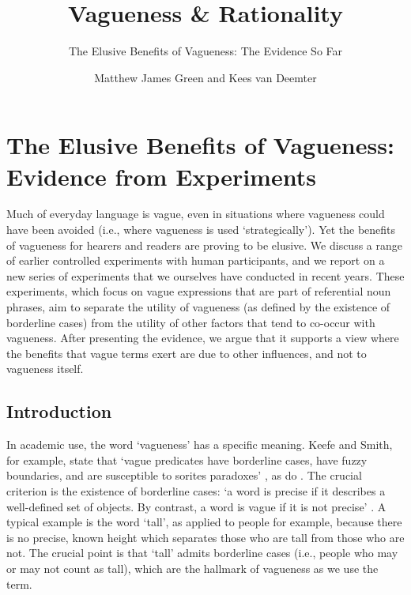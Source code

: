 \documentclass[ %
  graybox       %
 ,envcountchap  %
 ,sectrefs      %
]{svmono}
\begin{document}
\author{Matthew James Green and Kees van Deemter}
\title{Vagueness \& Rationality}
\subtitle{The Elusive Benefits of Vagueness: The Evidence So Far}
\date{}
\maketitle
\frontmatter
\tableofcontents
\mainmatter

\chapter{The Elusive Benefits of Vagueness: Evidence from Experiments}
Much of everyday language is vague, even in situations where vagueness could have been avoided (i.e., where vagueness is used `strategically').
Yet the benefits of vagueness for hearers and readers are proving to be elusive.
We discuss a range of earlier controlled experiments with human participants, and we report on a new series of experiments that we ourselves have conducted in recent years.
These experiments, which focus on vague expressions that are part of referential noun phrases, aim to separate the utility of vagueness (as defined by the existence of borderline cases) from the utility of other factors that tend to co-occur with vagueness.
After presenting the evidence, we argue that it supports a view where the benefits that vague terms exert are due to other influences, and not to vagueness itself.

\section{Introduction}
In academic use, the word `vagueness' has a specific meaning.
Keefe and Smith, for example, state that `vague predicates have borderline cases, have fuzzy boundaries, and are susceptible to sorites paradoxes' \citep[p.~4]{keefe1997vagueness}, as do \citet{EgreKlinedinst}.
The crucial criterion is the existence of borderline cases: `a word is precise if it describes a well-defined set of objects. By contrast, a word is vague if it is not precise' \citet[p.~1]{lipmanvague}.
A typical example is the word `tall', as applied to people for example, because there is no precise, known height which separates those who are tall from those who are not.
The crucial point is that `tall' admits borderline cases (i.e., people who may or may not count as tall), which are the hallmark of vagueness as we use the term.
\end{document}
